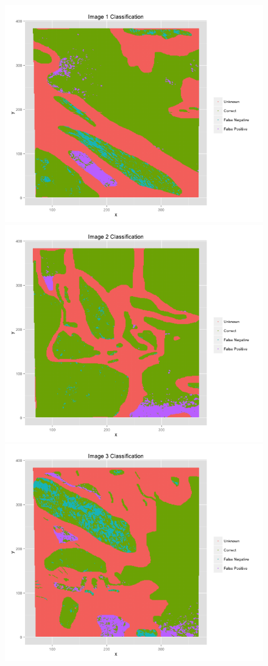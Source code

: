 \documentclass{article}\usepackage[]{graphicx}\usepackage[]{color}
\begin{document}
\begin{figure}
\includegraphics[scale = .35]{Image1Errors.png}
\includegraphics[scale = .35]{Image2Errors.png}
\includegraphics[scale = .35]{Image3Errors.png}

\end{figure}
\end{document}
